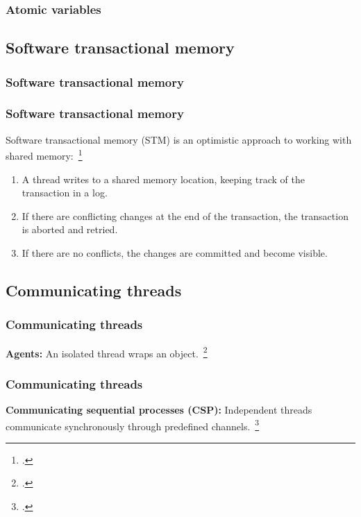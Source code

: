 \documentclass[aspectratio=1610]{beamer}
\begin{document}
  \begin{frame}
    \frametitle{Atomic variables}
    \centering
    
  \end{frame}

  \subsection{Software transactional memory}

  \begin{frame}
    \frametitle{Software transactional memory}
    \centering
    
  \end{frame}

  \begin{frame}
    \frametitle{Software transactional memory}

    Software transactional memory (STM) is an optimistic approach to working with shared memory:~\footcite{Shavit1995}

    \begin{enumerate}
      \item A thread writes to a shared memory location, keeping track of the transaction in a log.
      \item If there are conflicting changes at the end of the transaction, the transaction is aborted and retried.
      \item If there are no conflicts, the changes are committed and become visible.
    \end{enumerate}
  \end{frame}

  \subsection{Communicating threads}

  \begin{frame}
    \frametitle{Communicating threads}
    \centering
    
    \vfill
    \textbf{Agents:} An isolated thread wraps an object.~\footcite{Swalens2014}
  \end{frame}

  \begin{frame}
    \frametitle{Communicating threads}
    \centering
    
    \vfill
    \textbf{Communicating sequential processes (CSP):} Independent threads communicate synchronously through predefined channels.~\footcite{Hoare1978}
  \end{frame}
\end{document}
